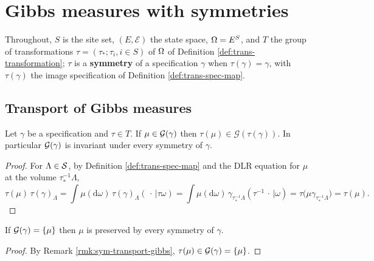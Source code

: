 \section{Gibbs measures with symmetries}

Throughout, $S$ is the site set, $(E,\mathcal{E})$ the state space, $\Omega = E^S$, and $T$ the
group of transformations $\tau = (\tau_*; \tau_i, i \in S)$ of $\Omega$ of
Definition \ref{def:trans-transformation}; $\tau$ is a \textbf{symmetry} of a specification
$\gamma$ when $\tau(\gamma) = \gamma$, with $\tau(\gamma)$ the image specification of
Definition \ref{def:trans-spec-map}.

\subsection*{Transport of Gibbs measures}

\begin{remark}[Georgii (5.10)]
    \label{rmk:sym-transport-gibbs}
    \leanok

    Let $\gamma$ be a specification and $\tau \in T$. If $\mu \in \mathcal{G}(\gamma)$ then
    $\tau(\mu) \in \mathcal{G}(\tau(\gamma))$. In particular $\mathcal{G}(\gamma)$ is invariant under
    every symmetry of $\gamma$.
\end{remark}
\begin{proof}
    \leanok

    For $\Lambda \in \mathcal{S}$, by Definition \ref{def:trans-spec-map} and the DLR equation for $\mu$
    at the volume $\tau_*^{-1}\Lambda$,
    \[
      \tau(\mu)\,\tau(\gamma)_\Lambda
        = \int \mu(\mathrm{d}\omega)\, \tau(\gamma)_\Lambda(\,\cdot\, | \tau\omega)
        = \int \mu(\mathrm{d}\omega)\, \gamma_{\tau_*^{-1}\Lambda}(\tau^{-1}\,\cdot\,|\omega)
        = \tau\bigl(\mu\gamma_{\tau_*^{-1}\Lambda}\bigr) = \tau(\mu).
    \]
\end{proof}

\begin{corollary}[Georgii (5.11)]
    \label{cor:sym-unique-invariant}
    \leanok

    If $\mathcal{G}(\gamma) = \left\{ \mu \right\}$ then $\mu$ is preserved by every symmetry of $\gamma$.
\end{corollary}
\begin{proof}
    \leanok

    By Remark \ref{rmk:sym-transport-gibbs}, $\tau(\mu) \in \mathcal{G}(\gamma) = \left\{ \mu \right\}$.
\end{proof}

